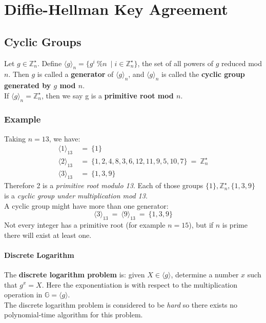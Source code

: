 \documentclass{article}
\begin{document}
		\section{Diffie-Hellman Key Agreement}
		\begin{adjustwidth}{2em}{2em}
			\subsection{Cyclic Groups}
			\begin{adjustwidth}{2em}{2em}
				Let $g \in \mathbb{Z}_n^{\star}$. Define $\langle g \rangle_n = \{ g^{i} \ \% n \ \mid i \in \mathbb{Z}_n^{\star}\}$, the set of all powers of $g$ reduced mod $n$. Then $g$ is called a \textbf{generator} of $\langle g \rangle_n$, and $\langle g \rangle_n$ is called the \textbf{cyclic group generated by $g$ mod $n$}. \\
				 If $\langle g \rangle_n = \mathbb{Z}_n^{\star}$, then we say g is a \textbf{primitive root mod $n$}.
				 \subsubsection{Example}
				 \begin{adjustwidth}{2em}{1em}
				 	Taking $n = 13$, we have:
				 	\begin{align*}
				 		\langle 1 \rangle _{13} \ & = \ \{ 1 \} \\
				 		\langle 2 \rangle _{13} \ & = \ \{ 1,2,4,8,3,6,12,11,9,5,10,7 \} \ = \ \mathbb{Z}_n^{\star} \\
				 		\langle 3 \rangle _{13} \ & = \ \{ 1,3,9 \}
				 	\end{align*}
				 	Therefore 2 is a \textit{primitive root modulo 13}. Each of those groups $\{ 1 \}, \mathbb{Z}_n^{\star}, \{ 1,3,9 \}$ is a \textit{cyclic group under multiplication mod 13}. \\
				 	A cyclic group might have more than one generator:
				 	\[
				 		\langle 3 \rangle_{13} \ = \ \langle 9 \rangle_{13} \ = \ \{ 1,3,9 \}
				 	\]
				 	Not every integer has a primitive root (for example $n = 15$), but if $n$ is prime there will exist at least one.
				 	\paragraph{Discrete Logarithm}
				 		\begin{adjustwidth}{2em}{}
				 			The \textbf{discrete logarithm problem} is: given $X \in \langle g \rangle$, determine a number $x$ such that $g^x = X$. Here the exponentiation is with respect to the multiplication operation in $\mathbb{G} = \langle g \rangle$. \\
				 			The discrete logarithm problem is considered to be \textit{hard} so there exists no polynomial-time algorithm for this problem.
				 		\end{adjustwidth}
				 \end{adjustwidth}
			\end{adjustwidth}

\end{adjustwidth}
\end{document}
